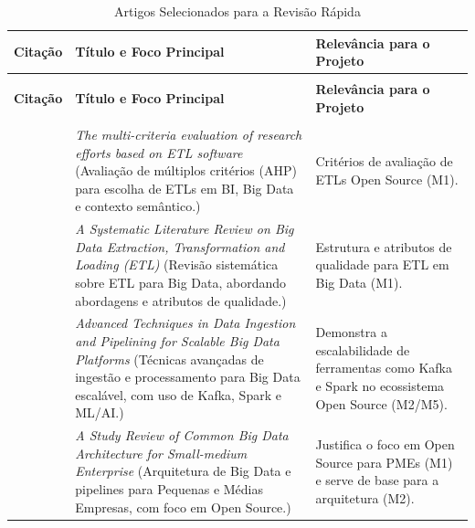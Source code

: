 \small
\setlength{\extrarowheight}{3pt}
\renewcommand{\arraystretch}{1.3}

\begin{longtable}{
    >{\raggedright\arraybackslash}p{2.6cm}
    >{\raggedright\arraybackslash}p{5.8cm}
    >{\raggedright\arraybackslash}p{4.8cm}
}

\caption{Artigos Selecionados para a Revisão Rápida}
\label{tab:artigos_selecionados}\\

\toprule
\textbf{Citação} & \textbf{Título e Foco Principal} & \textbf{Relevância para o Projeto} \\
\midrule
\endfirsthead

\multicolumn{3}{c}{\textit{Continuação da Tabela \ref{tab:artigos_selecionados}}} \\
\toprule
\textbf{Citação} & \textbf{Título e Foco Principal} & \textbf{Relevância para o Projeto} \\
\midrule
\endhead

\midrule
\multicolumn{3}{r}{\textit{Continua na próxima página}} \\
\endfoot

\bottomrule
\endlastfoot

\rowcolor[gray]{0.96}
\cite[]{boulahia2024} &
\textit{The multi-criteria evaluation of research efforts based on ETL software} \newline
(Avaliação de múltiplos critérios (AHP) para escolha de ETLs em BI, Big Data e contexto semântico.) &
Critérios de avaliação de ETLs Open Source (M1). \\

\cite[]{nwokeji2021} &
\textit{A Systematic Literature Review on Big Data Extraction, Transformation and Loading (ETL)} \newline
(Revisão sistemática sobre ETL para Big Data, abordando abordagens e atributos de qualidade.) &
Estrutura e atributos de qualidade para ETL em Big Data (M1). \\

\rowcolor[gray]{0.96}
\cite[]{murarka2024} &
\textit{Advanced Techniques in Data Ingestion and Pipelining for Scalable Big Data Platforms} \newline
(Técnicas avançadas de ingestão e processamento para Big Data escalável, com uso de Kafka, Spark e ML/AI.) &
Demonstra a escalabilidade de ferramentas como Kafka e Spark no ecossistema Open Source (M2/M5). \\

\cite[]{septian2019} &
\textit{A Study Review of Common Big Data Architecture for Small-medium Enterprise} \newline
(Arquitetura de Big Data e pipelines para Pequenas e Médias Empresas, com foco em Open Source.) &
Justifica o foco em Open Source para PMEs (M1) e serve de base para a arquitetura (M2). \\


\end{longtable}

